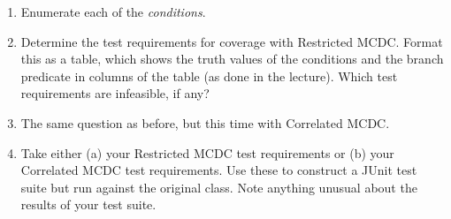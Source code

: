 \begin{enumerate}
        \begin{enumerate}

            \item Enumerate each of the {\it conditions}.
            
            \item Determine the test requirements for coverage with Restricted
            MCDC. Format this as a table, which shows the truth values of the
            conditions and the branch predicate in columns of the table (as done
            in the lecture). Which test requirements are infeasible, if any?

            \item The same question as before, but this time with Correlated MCDC. 
            
            \item Take either (a) your Restricted MCDC test requirements or (b) your
            Correlated MCDC test requirements. Use these to construct a JUnit test
            suite but run against the original \triangleclass class. Note anything
            unusual about the results of your test suite.
            
        \end{enumerate}
        
\end{enumerate}

